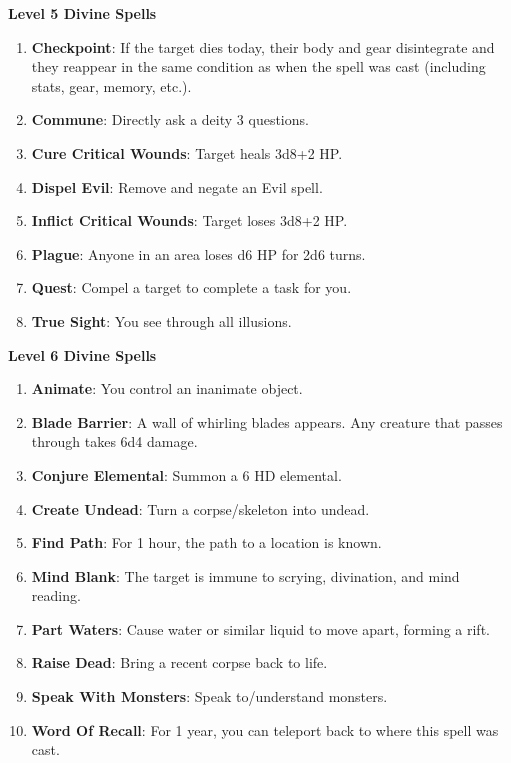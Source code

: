\documentclass[twoside]{article}
\begin{document}
\textbf{Level 5 Divine Spells}
\begin{enumerate}[nosep]
\item \textbf{Checkpoint}: If the target dies today, their body and gear disintegrate and they reappear in the same condition as when the spell was cast (including stats, gear, memory, etc.).
\item \textbf{Commune}: Directly ask a deity 3 questions.
\item \textbf{Cure Critical Wounds}: Target heals 3d8+2 HP.
\item \textbf{Dispel Evil}: Remove and negate an Evil spell.
\item \textbf{Inflict Critical Wounds}: Target loses 3d8+2 HP.
\item \textbf{Plague}: Anyone in an area loses d6 HP for 2d6 turns.
\item \textbf{Quest}: Compel a target to complete a task for you.
\item \textbf{True Sight}: You see through all illusions.
\end{enumerate}

\textbf{Level 6 Divine Spells}
\begin{enumerate}[nosep]
\item \textbf{Animate}: You control an inanimate object.
\item \textbf{Blade Barrier}: A wall of whirling blades appears. Any creature that passes through takes 6d4 damage.
\item \textbf{Conjure Elemental}: Summon a 6 HD elemental.
\item \textbf{Create Undead}: Turn a corpse/skeleton into undead.
\item \textbf{Find Path}: For 1 hour, the path to a location is known.
\item \textbf{Mind Blank}: The target is immune to scrying, divination, and mind reading.
\item \textbf{Part Waters}: Cause water or similar liquid to move apart, forming a rift.
\item \textbf{Raise Dead}: Bring a recent corpse back to life.
\item \textbf{Speak With Monsters}: Speak to/understand monsters.
\item \textbf{Word Of Recall}: For 1 year, you can teleport back to where this spell was cast.
\end{enumerate}
\end{document}
